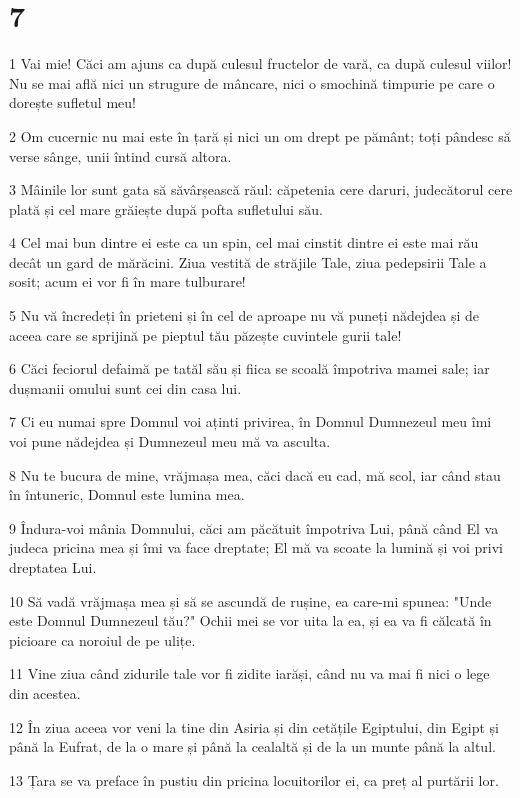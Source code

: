 \chapter{7}

\par 1 Vai mie! Căci am ajuns ca după culesul fructelor de vară, ca după culesul viilor! Nu se mai află nici un strugure de mâncare, nici o smochină timpurie pe care o dorește sufletul meu!
\par 2 Om cucernic nu mai este în țară și nici un om drept pe pământ; toți pândesc să verse sânge, unii întind cursă altora.
\par 3 Mâinile lor sunt gata să săvârșească răul: căpetenia cere daruri, judecătorul cere plată și cel mare grăiește după pofta sufletului său.
\par 4 Cel mai bun dintre ei este ca un spin, cel mai cinstit dintre ei este mai rău decât un gard de mărăcini. Ziua vestită de străjile Tale, ziua pedepsirii Tale a sosit; acum ei vor fi în mare tulburare!
\par 5 Nu vă încredeți în prieteni și în cel de aproape nu vă puneți nădejdea și de aceea care se sprijină pe pieptul tău păzește cuvintele gurii tale!
\par 6 Căci feciorul defaimă pe tatăl său și fiica se scoală împotriva mamei sale; iar dușmanii omului sunt cei din casa lui.
\par 7 Ci eu numai spre Domnul voi aținti privirea, în Domnul Dumnezeul meu îmi voi pune nădejdea și Dumnezeul meu mă va asculta.
\par 8 Nu te bucura de mine, vrăjmașa mea, căci dacă eu cad, mă scol, iar când stau în întuneric, Domnul este lumina mea.
\par 9 Îndura-voi mânia Domnului, căci am păcătuit împotriva Lui, până când El va judeca pricina mea și îmi va face dreptate; El mă va scoate la lumină și voi privi dreptatea Lui.
\par 10 Să vadă vrăjmașa mea și să se ascundă de rușine, ea care-mi spunea: "Unde este Domnul Dumnezeul tău?" Ochii mei se vor uita la ea, și ea va fi călcată în picioare ca noroiul de pe ulițe.
\par 11 Vine ziua când zidurile tale vor fi zidite iarăși, când nu va mai fi nici o lege din acestea.
\par 12 În ziua aceea vor veni la tine din Asiria și din cetățile Egiptului, din Egipt și până la Eufrat, de la o mare și până la cealaltă și de la un munte până la altul.
\par 13 Țara se va preface în pustiu din pricina locuitorilor ei, ca preț al purtării lor.
